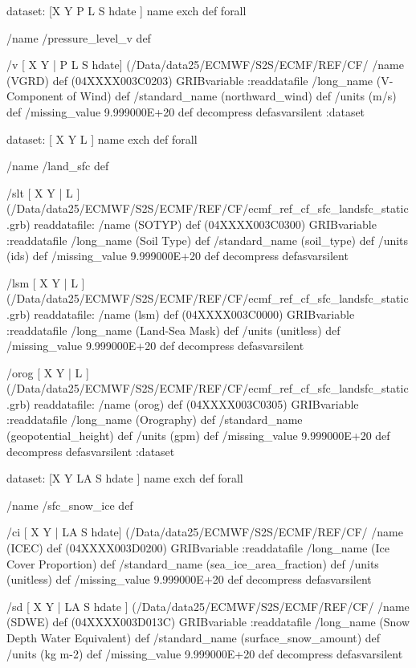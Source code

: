 \begin{ingrid}
{dataset:
[X Y P L S hdate ] {name exch def } forall

/name /pressure_level_v def

/v { [ X Y | P L S hdate] (/Data/data25/ECMWF/S2S/ECMF/REF/CF/%
/name (VGRD) def
(04XXXX003C0203) GRIBvariable
:readdatafile
/long_name (V-Component of Wind) def
/standard_name (northward_wind) def
/units (m/s) def
/missing_value 9.999000E+20 def
decompress
} defasvarsilent
:dataset

dataset:
[ X Y L ] {name exch def } forall

/name /land_sfc def

/slt { [ X Y | L ] (/Data/data25/ECMWF/S2S/ECMF/REF/CF/ecmf_ref_cf_sfc_landsfc_static.grb) readdatafile:
/name (SOTYP) def
(04XXXX003C0300) GRIBvariable
:readdatafile
/long_name (Soil Type) def
/standard_name (soil_type) def
/units (ids) def
/missing_value 9.999000E+20 def
decompress
} defasvarsilent

/lsm { [ X Y | L ] (/Data/data25/ECMWF/S2S/ECMF/REF/CF/ecmf_ref_cf_sfc_landsfc_static.grb) readdatafile:
/name (lsm) def
(04XXXX003C0000) GRIBvariable
:readdatafile
/long_name (Land-Sea Mask) def
/units (unitless) def
/missing_value 9.999000E+20 def
decompress
} defasvarsilent

/orog { [ X Y | L ] (/Data/data25/ECMWF/S2S/ECMF/REF/CF/ecmf_ref_cf_sfc_landsfc_static.grb) readdatafile:
/name (orog) def
(04XXXX003C0305) GRIBvariable
:readdatafile
/long_name (Orography) def
/standard_name (geopotential_height) def
/units (gpm) def
/missing_value 9.999000E+20 def
decompress
} defasvarsilent
:dataset

dataset:
[X Y LA S hdate ] {name exch def } forall

/name /sfc_snow_ice def

/ci { [ X Y | LA S hdate] (/Data/data25/ECMWF/S2S/ECMF/REF/CF/%
/name (ICEC) def
(04XXXX003D0200) GRIBvariable
:readdatafile
/long_name (Ice Cover Proportion) def
/standard_name (sea_ice_area_fraction) def
/units (unitless) def
/missing_value 9.999000E+20 def
decompress
} defasvarsilent

/sd { [ X Y | LA S hdate ] (/Data/data25/ECMWF/S2S/ECMF/REF/CF/%
/name (SDWE) def
(04XXXX003D013C) GRIBvariable
:readdatafile
/long_name (Snow Depth Water Equivalent) def
/standard_name (surface_snow_amount) def 
/units (kg m-2) def
/missing_value 9.999000E+20 def
decompress
} defasvarsilent

}
\end{ingrid}
